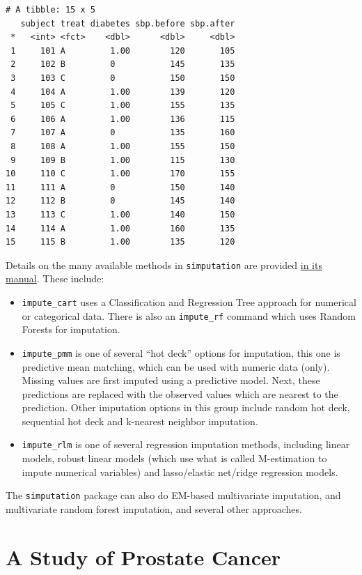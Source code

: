 \documentclass[]{book}
\providecommand{\tightlist}{%
  \setlength{\itemsep}{0pt}\setlength{\parskip}{0pt}}
\theoremstyle{definition}
\theoremstyle{definition}
\theoremstyle{definition}
\theoremstyle{remark}
\begin{document}
\begin{verbatim}
# A tibble: 15 x 5
   subject treat diabetes sbp.before sbp.after
 *   <int> <fct>    <dbl>      <dbl>     <dbl>
 1     101 A         1.00        120       105
 2     102 B         0           145       135
 3     103 C         0           150       150
 4     104 A         1.00        139       120
 5     105 C         1.00        155       135
 6     106 A         1.00        136       115
 7     107 A         0           135       160
 8     108 A         1.00        155       150
 9     109 B         1.00        115       130
10     110 C         1.00        170       155
11     111 A         0           150       140
12     112 B         0           145       140
13     113 C         1.00        140       150
14     114 A         1.00        160       135
15     115 B         1.00        135       120
\end{verbatim}

Details on the many available methods in \texttt{simputation} are
provided
\href{https://cran.r-project.org/web/packages/simputation/simputation.pdf}{in
its manual}. These include:

\begin{itemize}
\tightlist
\item
  \texttt{impute\_cart} uses a Classification and Regression Tree
  approach for numerical or categorical data. There is also an
  \texttt{impute\_rf} command which uses Random Forests for imputation.
\item
  \texttt{impute\_pmm} is one of several ``hot deck'' options for
  imputation, this one is predictive mean matching, which can be used
  with numeric data (only). Missing values are first imputed using a
  predictive model. Next, these predictions are replaced with the
  observed values which are nearest to the prediction. Other imputation
  options in this group include random hot deck, sequential hot deck and
  k-nearest neighbor imputation.
\item
  \texttt{impute\_rlm} is one of several regression imputation methods,
  including linear models, robust linear models (which use what is
  called M-estimation to impute numerical variables) and lasso/elastic
  net/ridge regression models.
\end{itemize}

The \texttt{simputation} package can also do EM-based multivariate
imputation, and multivariate random forest imputation, and several other
approaches.

\chapter{A Study of Prostate Cancer}\label{a-study-of-prostate-cancer}
\end{document}
